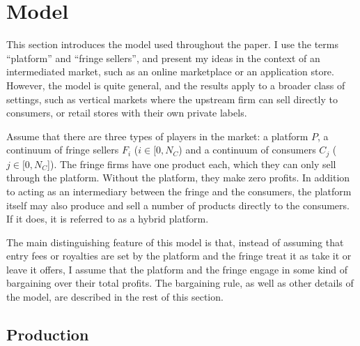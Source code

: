 \documentclass[a4paper]{article}
\begin{document}
\section{Model}
\label{sec:model}

This section introduces the model used throughout the paper.
I use the terms ``platform'' and ``fringe sellers'', and present my ideas in the context of an intermediated market, such as an online marketplace or an application store.
However, the model is quite general, and the results apply to a broader class of settings, such as vertical markets where the upstream firm can sell directly to consumers, or retail stores with their own private labels.

Assume that there are three types of players in the market: a platform $P$, a continuum of fringe sellers $F_i$ ($i \in [0, N_C$) and a continuum of consumers $C_j$ ($j \in [0, N_C$]).
The fringe firms have one product each, which they can only sell through the platform.
Without the platform, they make zero profits.
In addition to acting as an intermediary between the fringe and the consumers, the platform itself may also produce and sell a number of products directly to the consumers.
If it does, it is referred to as a hybrid platform.

The main distinguishing feature of this model is that, instead of assuming that entry fees or royalties are set by the platform and the fringe treat it as take it or leave it offers, I assume that the platform and the fringe engage in some kind of bargaining over their total profits.
The bargaining rule, as well as other details of the model, are described in the rest of this section.


\subsection{Production}
\end{document}
